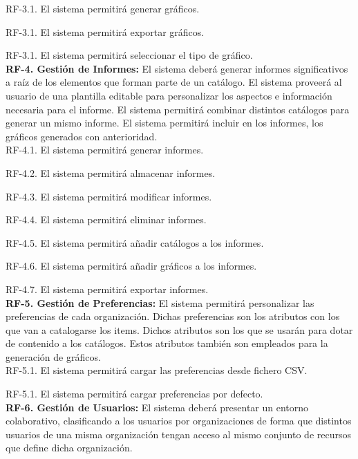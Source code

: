 \documentclass[a4paper,11pt]{book}
\begin{document}
	RF-3.1. El sistema permitirá generar gráficos.
	
	RF-3.1. El sistema permitirá exportar gráficos.
	
	RF-3.1. El sistema permitirá seleccionar el tipo de gráfico.\\	


	 
\textbf{RF-4. Gestión de Informes:} El sistema deberá generar informes significativos a raíz de los elementos que forman parte de un catálogo. El sistema proveerá al usuario de una plantilla editable para personalizar los aspectos e información necesaria para el informe. El sistema permitirá combinar distintos catálogos para generar un mismo informe.  El sistema permitirá incluir en los informes, los gráficos generados con anterioridad.\\ 

	

	RF-4.1. El sistema permitirá generar informes.
	
	RF-4.2. El sistema permitirá almacenar informes.
	
	RF-4.3. El sistema permitirá modificar informes.
	
	RF-4.4. El sistema permitirá eliminar informes.
	
	RF-4.5. El sistema permitirá añadir catálogos a los informes.
	
	RF-4.6. El sistema permitirá añadir gráficos a los informes.
	
	RF-4.7. El sistema permitirá exportar informes.\\
	

\textbf{RF-5. Gestión de Preferencias:} El sistema permitirá personalizar las preferencias de cada organización. Dichas preferencias son los atributos con los que van a catalogarse los items. Dichos atributos son los que se usarán para dotar de contenido a los catálogos. Estos atributos también son empleados para la generación de gráficos. \\


	RF-5.1. El sistema permitirá cargar las preferencias desde fichero CSV.
	
	RF-5.1. El sistema permitirá cargar preferencias por defecto. \\
	
	

\textbf{RF-6. Gestión de Usuarios:} El sistema deberá presentar un entorno colaborativo, clasificando a los usuarios por organizaciones de forma que distintos usuarios de una misma organización tengan acceso al mismo conjunto de recursos que define dicha organización. \\
\end{document}
